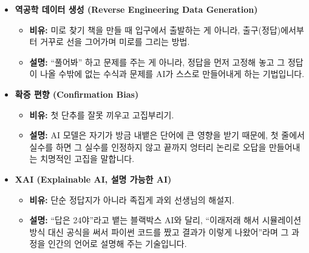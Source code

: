 \documentclass[11pt,a4paper]{article}
\begin{document}
\begin{itemize}
\begin{itemize}
    \end{itemize}
    \item \textbf{역공학 데이터 생성 (Reverse Engineering Data Generation)}
    \begin{itemize}
        \item \textbf{비유:} 미로 찾기 책을 만들 때 입구에서 출발하는 게 아니라, 출구(정답)에서부터 거꾸로 선을 그어가며 미로를 그리는 방법.
        \item \textbf{설명:} ``풀어봐'' 하고 문제를 주는 게 아니라, 정답을 먼저 고정해 놓고 그 정답이 나올 수밖에 없는 수식과 문제를 AI가 스스로 만들어내게 하는 기법입니다.
    \end{itemize}
    \item \textbf{확증 편향 (Confirmation Bias)}
    \begin{itemize}
        \item \textbf{비유:} 첫 단추를 잘못 끼우고 고집부리기.
        \item \textbf{설명:} AI 모델은 자기가 방금 내뱉은 단어에 큰 영향을 받기 때문에, 첫 줄에서 실수를 하면 그 실수를 인정하지 않고 끝까지 엉터리 논리로 오답을 만들어내는 치명적인 고집을 말합니다. 
    \end{itemize}
    \item \textbf{XAI (Explainable AI, 설명 가능한 AI)}
    \begin{itemize}
        \item \textbf{비유:} 단순 정답지가 아니라 족집게 과외 선생님의 해설지.
        \item \textbf{설명:} ``답은 24야''라고 뱉는 블랙박스 AI와 달리, ``이래저래 해서 시뮬레이션 방식 대신 공식을 써서 파이썬 코드를 짰고 결과가 이렇게 나왔어''라며 그 과정을 인간의 언어로 설명해 주는 기술입니다.
    \end{itemize}
\end{itemize}
\end{document}
